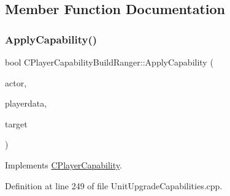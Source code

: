 \subsection{Member Function Documentation}
\hypertarget{classCPlayerCapabilityBuildRanger_a113a97c3d833f206d333cb0e2e37aa31}{}\label{classCPlayerCapabilityBuildRanger_a113a97c3d833f206d333cb0e2e37aa31} 
\subsubsection{\texorpdfstring{Apply\+Capability()}{ApplyCapability()}}
{\footnotesize\ttfamily bool C\+Player\+Capability\+Build\+Ranger\+::\+Apply\+Capability (\begin{DoxyParamCaption}\item[{std\+::shared\+\_\+ptr$<$ \hyperlink{classCPlayerAsset}{C\+Player\+Asset} $>$}]{actor,  }\item[{std\+::shared\+\_\+ptr$<$ \hyperlink{classCPlayerData}{C\+Player\+Data} $>$}]{playerdata,  }\item[{std\+::shared\+\_\+ptr$<$ \hyperlink{classCPlayerAsset}{C\+Player\+Asset} $>$}]{target }\end{DoxyParamCaption})\hspace{0.3cm}{\ttfamily [virtual]}}



Implements \hyperlink{classCPlayerCapability_a2ca6fd7fbd9c0178f1cf1d049c63825f}{C\+Player\+Capability}.



Definition at line 249 of file Unit\+Upgrade\+Capabilities.\+cpp.


